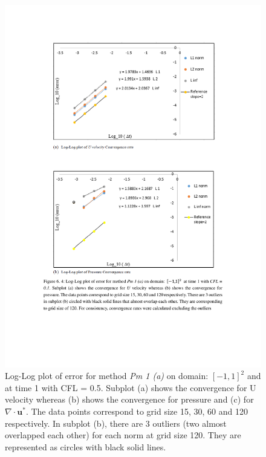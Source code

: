 \begin{figure}[H]
	\centering
	\includegraphics[scale=0.9]{figures/Pm1a_pf2_rate_t_1_cfl_0_5.pdf}
	\caption{Log-Log plot of error for method \textit{Pm 1 (a)} on domain: $[-1,1]^2$ and at time 1 with CFL = 0.5. Subplot (a) shows the convergence for U velocity whereas (b) shows the convergence for pressure and (c) for $\nabla \cdot \textbf{u}^*$. The data points correspond to grid size 15, 30, 60 and 120 respectively. In subplot (b), there are 3 outliers (two almost overlapped each other) for each norm at grid size 120. They are represented as circles with black solid lines.}\label{fig:6.4}
\end{figure}

